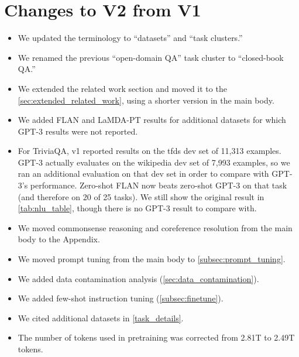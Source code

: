 \documentclass{article} %
\newcommand{\flan}{FLAN}
\newcommand{\baselm}{LaMDA-PT}
\begin{document}
\section*{Changes to V2 from V1}
\begin{itemize}
    \item We updated the terminology to ``datasets'' and ``task clusters.''
    \item We renamed the previous ``open-domain QA'' task cluster to ``closed-book QA.''
    \item We extended the related work section and moved it to the \cref{sec:extended_related_work}, using a shorter version in the main body.
    \item We added \flan{} and \baselm{} results for additional datasets for which GPT-3 results were not reported.
    \item For TriviaQA, v1 reported results on the tfds dev set of 11,313 examples. GPT-3 actually evaluates on the wikipedia dev set of 7,993 examples, so we ran an additional evaluation on that dev set in order to compare with GPT-3's performance. Zero-shot \flan{} now beats zero-shot GPT-3 on that task (and therefore on 20 of 25 tasks). We still show the original result in \cref{tab:nlu_table}, though there is no GPT-3 result to compare with.
    \item We moved commonsense reasoning and coreference resolution from the main body to the Appendix.
    \item We moved prompt tuning from the main body to \cref{subsec:prompt_tuning}.
    \item We added data contamination analysis (\cref{sec:data_contamination}).
    \item We added few-shot instruction tuning (\cref{subsec:finetune}).
    \item We cited additional datasets in \cref{task_details}.
    \item The number of tokens used in pretraining was corrected from 2.81T to 2.49T tokens.
\end{itemize}


\end{document}
